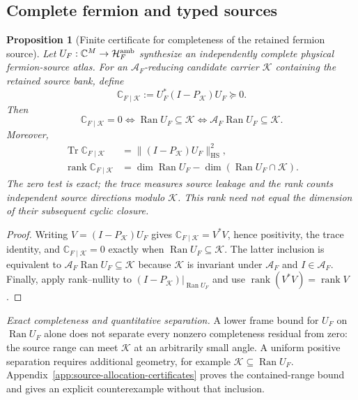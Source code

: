 \documentclass[11pt]{article}
\numberwithin{equation}{section}
\newtheorem{proposition}[theorem]{Proposition}
\theoremstyle{definition}
\theoremstyle{remark}
\newcommand{\C}{\mathbb C}
\newcommand{\Tr}{\operatorname{Tr}}
\newcommand{\rank}{\operatorname{rank}}
\newcommand{\Ran}{\operatorname{Ran}}
\newcommand{\HS}{\mathrm{HS}}
\newcommand{\Hh}{\mathcal H}
\begin{document}
\subsection{Complete fermion and typed sources}

\begin{proposition}[Finite certificate for completeness of the retained fermion source]
\label{prop:fermion-source-completeness}
Let $U_F:\C^M\to\Hh_F^{\rm amb}$ synthesize an independently complete
physical fermion-source atlas.  For an $\mathcal A_F$-reducing candidate
carrier $\mathcal K$ containing the retained source bank, define
\begin{equation}
 \mathbb C_{F\mid\mathcal K}
 :=U_F^*(I-P_{\mathcal K})U_F\succeq0.
 \label{eq:fermion-source-completeness}
\end{equation}
Then
\begin{equation}
 \mathbb C_{F\mid\mathcal K}=0
 \iff \Ran U_F\subseteq\mathcal K
 \iff \mathcal A_F\Ran U_F\subseteq\mathcal K.
 \label{eq:fermion-source-completeness-zero}
\end{equation}
Moreover,
\begin{align}
 \Tr\mathbb C_{F\mid\mathcal K}
 &=\|(I-P_{\mathcal K})U_F\|_{\HS}^2,\nonumber\\
 \rank\mathbb C_{F\mid\mathcal K}
 &=\dim\Ran U_F-\dim(\Ran U_F\cap\mathcal K).
 \label{eq:fermion-source-completeness-rank}
\end{align}
The zero test is exact; the trace measures source leakage and the rank counts
independent source directions modulo $\mathcal K$.  This rank need not equal
the dimension of their subsequent cyclic closure.
\end{proposition}

\begin{proof}
Writing $V=(I-P_{\mathcal K})U_F$ gives
$\mathbb C_{F\mid\mathcal K}=V^*V$, hence positivity, the trace identity, and
$\mathbb C_{F\mid\mathcal K}=0$ exactly when $\Ran U_F\subseteq\mathcal K$.
The latter inclusion is equivalent to
$\mathcal A_F\Ran U_F\subseteq\mathcal K$ because $\mathcal K$ is invariant
under $\mathcal A_F$ and $I\in\mathcal A_F$.  Finally, apply rank--nullity to
$(I-P_{\mathcal K})|_{\Ran U_F}$ and use $\rank(V^*V)=\rank V$.
\end{proof}

\noindent\textit{Exact completeness and quantitative separation.} A lower frame bound for $U_F$ on $\Ran U_F$ alone does not separate every
nonzero completeness residual from zero: the source range can meet
$\mathcal K$ at an arbitrarily small angle.  A uniform positive separation
requires additional geometry, for example $\mathcal K\subseteq\Ran U_F$.
Appendix~\ref{app:source-allocation-certificates} proves the contained-range
bound and gives an explicit counterexample without that inclusion.
\end{document}
